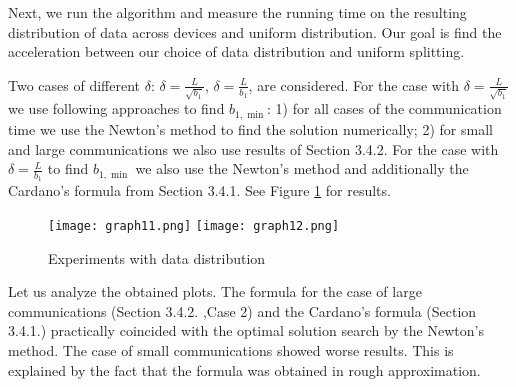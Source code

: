 \documentclass{article}
\theoremstyle{definition}
\theoremstyle{plain}
\begin{document}
Next, we run the algorithm and measure the running time on the resulting distribution of data across devices and uniform distribution. Our goal is find the acceleration between our choice of data distribution and uniform splitting.

Two cases of different $\delta$: $\delta = \frac{L}{\sqrt{b_1}}$, $\delta = \frac{L}{b_1}$, are considered. For the case with $\delta = \frac{L}{\sqrt{b_1}}$ we use following approaches to find $b_{1, \min}$: 1) for all cases of the communication time we use the Newton's method to find the solution numerically; 2) for small and large communications we also use results of Section 3.4.2. 
For the case with $\delta = \frac{L}{b_1}$ to find $b_{1, \min}$ we also use the Newton's method and additionally the Cardano's formula from Section 3.4.1. See Figure \ref{ris:image} for results.


\begin{figure}[!ht]
    {\texttt{[image: graph11.png]}}
    {\texttt{[image: graph12.png]}}
    \caption{Experiments with data distribution}
    \label{ris:image}
\end{figure}



Let us analyze the obtained plots. The formula for the case of large communications (Section 3.4.2. ,Case 2) and the Cardano's formula (Section 3.4.1.) practically coincided with the optimal solution search by the Newton's method. The case of small communications showed worse results. This is explained by the fact that the formula was obtained in rough approximation. 
\end{document}
